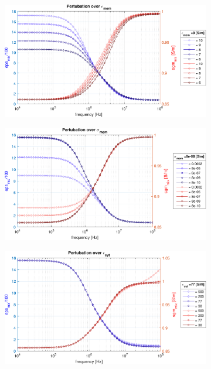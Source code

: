 \begin{figure}[t!]
	\begin{subfigure}{0.5\linewidth}
		\centering
	\includegraphics[width=0.95\linewidth]{../code/figs/eps_mem_pert}
		\caption{}
		\label{fig:epsmempert}
	\end{subfigure}\hfill
	\begin{subfigure}{0.5\linewidth}
		\centering
\includegraphics[width=0.95\linewidth]{../code/figs/sgm_mem_pert}
\caption{}
\label{fig:sgmmempert}
	\end{subfigure}\vspace{0.6cm}
	\begin{subfigure}{0.5\linewidth}
	\centering
	\includegraphics[width=0.95\linewidth]{../code/figs/eps_cyt_pert}

\end{subfigure}
\end{figure}
